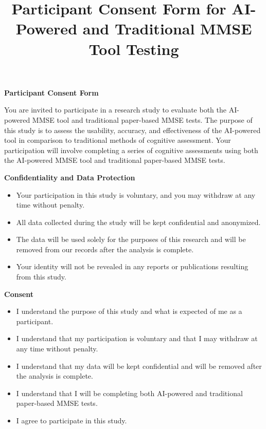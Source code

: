 \documentclass[11pt]{article}
\title{Participant Consent Form for AI-Powered and Traditional MMSE Tool Testing}
\date{}
\begin{document}
\maketitle
\begin{center}
    \large
    \textbf{Participant Consent Form}
\end{center}
\vspace{0.5cm}

\noindent
You are invited to participate in a research study to evaluate both the AI-powered MMSE tool and traditional paper-based MMSE tests. The purpose of this study is to assess the usability, accuracy, and effectiveness of the AI-powered tool in comparison to traditional methods of cognitive assessment. Your participation will involve completing a series of cognitive assessments using both the AI-powered MMSE tool and traditional paper-based MMSE tests.

\vspace{0.5cm}

\noindent
\textbf{Confidentiality and Data Protection}
\begin{itemize}
    \item Your participation in this study is voluntary, and you may withdraw at any time without penalty.
    \item All data collected during the study will be kept confidential and anonymized.
    \item The data will be used solely for the purposes of this research and will be removed from our records after the analysis is complete.
    \item Your identity will not be revealed in any reports or publications resulting from this study.
\end{itemize}

\vspace{0.5cm}

\noindent
\textbf{Consent}
\begin{itemize}
    \item I understand the purpose of this study and what is expected of me as a participant.
    \item I understand that my participation is voluntary and that I may withdraw at any time without penalty.
    \item I understand that my data will be kept confidential and will be removed after the analysis is complete.
    \item I understand that I will be completing both AI-powered and traditional paper-based MMSE tests.
    \item I agree to participate in this study.
\end{itemize}
\end{document}
